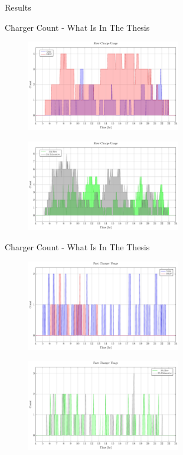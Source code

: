 \documentclass[aspectratio=169]{beamer}
\begin{document}
\begin{frame}[label={sec:org4ee59dd}]{Results}
\begin{frame}[label={sec:org24491af}]{Charger Count - What Is In The Thesis}
\begin{figure}[htpb]
\centering
    \includegraphics[width=0.6\textwidth]{img/sa-pap-paper-bad/charger-count-slow-milp-qin}
\end{figure}
\begin{figure}[htpb]
\centering
    \includegraphics[width=0.6\textwidth]{img/sa-pap-paper-bad/charger-count-slow-sa}
\end{figure}
\end{frame}

\begin{frame}[label={sec:orgcd6db83}]{Charger Count - What Is In The Thesis}
\begin{figure}[htpb]
\centering
    \includegraphics[width=0.6\textwidth]{img/sa-pap-paper-bad/charger-count-fast-milp-qin}
\end{figure}
\begin{figure}[htpb]
\centering
    \includegraphics[width=0.6\textwidth]{img/sa-pap-paper-bad/charger-count-fast-sa}
\end{figure}
\end{frame}


\end{frame}
\end{document}
